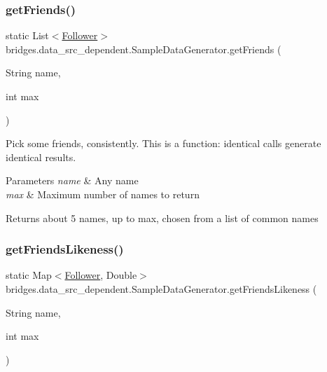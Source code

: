 \subsubsection{\texorpdfstring{getFriends()}{getFriends()}}
{\footnotesize\ttfamily static List$<$\mbox{\hyperlink{classbridges_1_1data__src__dependent_1_1_follower}{Follower}}$>$ bridges.\+data\+\_\+src\+\_\+dependent.\+Sample\+Data\+Generator.\+get\+Friends (\begin{DoxyParamCaption}\item[{String}]{name,  }\item[{int}]{max }\end{DoxyParamCaption})\hspace{0.3cm}{\ttfamily [static]}}

Pick some friends, consistently. This is a function\+: identical calls generate identical results. 
\begin{DoxyParams}{Parameters}
{\em name} & Any name \\
\hline
{\em max} & Maximum number of names to return \\
\hline
\end{DoxyParams}
\begin{DoxyReturn}{Returns}
about 5 names, up to max, chosen from a list of common names 
\end{DoxyReturn}
\mbox{\label{classbridges_1_1data__src__dependent_1_1_sample_data_generator_a940034ad3107806e65741dca0a029d1b}} 
\subsubsection{\texorpdfstring{getFriendsLikeness()}{getFriendsLikeness()}}
{\footnotesize\ttfamily static Map$<$\mbox{\hyperlink{classbridges_1_1data__src__dependent_1_1_follower}{Follower}}, Double$>$ bridges.\+data\+\_\+src\+\_\+dependent.\+Sample\+Data\+Generator.\+get\+Friends\+Likeness (\begin{DoxyParamCaption}\item[{String}]{name,  }\item[{int}]{max }\end{DoxyParamCaption})\hspace{0.3cm}{\ttfamily [static]}}

